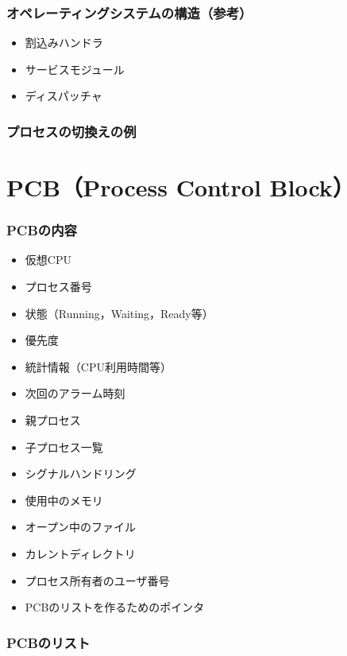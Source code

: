 \documentclass[dvipdfmx]{beamer}
\begin{document}
\begin{frame}
  \frametitle{オペレーティングシステムの構造（参考）}
  \begin{itemize}
    \item 割込みハンドラ
    \item サービスモジュール
    \item ディスパッチャ
  \end{itemize}
\end{frame}

\begin{frame}
  \frametitle{プロセスの切換えの例}
\end{frame}

\section{PCB（Process Control Block）}
\begin{frame}
  \frametitle{PCBの内容}
\begin{itemize}
\item 仮想CPU
\item プロセス番号
\item 状態（Running，Waiting，Ready等）
\item 優先度
\item 統計情報（CPU利用時間等）
\item 次回のアラーム時刻
\item 親プロセス
\item 子プロセス一覧
\item シグナルハンドリング
\item 使用中のメモリ
\item オープン中のファイル
\item カレントディレクトリ
\item プロセス所有者のユーザ番号
\item PCBのリストを作るためのポインタ
\end{itemize}
\end{frame}

\begin{frame}
  \frametitle{PCBのリスト}
\end{frame}
\end{document}
